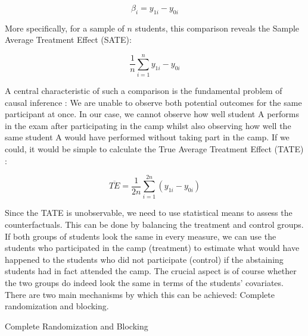 \documentclass[12pt,]{article}
\makeatletter
\renewcommand\subsubsection{\@startsection{subsubsection}{3}{\z@}
                                     {-3.25ex\@plus -1ex \@minus -.2ex}
                                     {1.5ex \@plus .2ex}
                                     {\normalsize\itshape}} %
\makeatother
\begin{document}
\singlespacing

\vspace{-0.5cm}

\[\beta_i = y_{1i} - y_{0i}\]

\doublespacing

More specifically, for a sample of \(n\) students, this comparison
reveals the Sample Average Treatment Effect (SATE):

\singlespacing

\vspace{-0.5cm}

\[\frac{1}{n} \sum\limits_{i=1}^n y_{1i} - y_{0i}\]

\doublespacing

A central characteristic of such a comparison is the fundamental problem
of causal inference
\citep{holland_1986_statistics, rubin_1974_estimating}: We are unable to
observe both potential outcomes for the same participant at once. In our
case, we cannot observe how well student A performs in the exam after
participating in the camp whilst also observing how well the same
student A would have performed without taking part in the camp. If we
could, it would be simple to calculate the True Average Treatment Effect
(TATE) \citep{moore_2012_multivariate}:

\singlespacing

\vspace{-0.5cm}

\[\overline{TE} = \frac{1}{2n} \sum\limits_{i=1}^{2n} (y_{1i} - y_{0i})\]

\doublespacing 

Since the TATE is unobservable, we need to use statistical means to
assess the counterfactuals. This can be done by balancing the treatment
and control groups. If both groups of students look the same in every
measure, we can use the students who participated in the camp
(treatment) to estimate what would have happened to the students who did
not participate (control) if the abstaining students had in fact
attended the camp. The crucial aspect is of course whether the two
groups do indeed look the same in terms of the students' covariates.
There are two main mechanisms by which this can be achieved: Complete
randomization and blocking.

\subsubsection{Complete Randomization and Blocking}\label{seq-complete}
\end{document}
